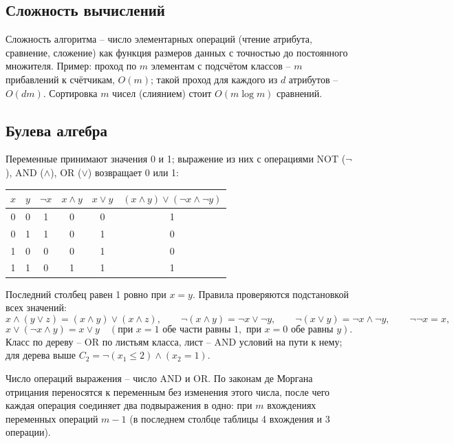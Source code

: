 \documentclass[12pt,a4paper]{article}
\begin{document}
\subsection{Сложность вычислений}

Сложность алгоритма -- число элементарных операций (чтение атрибута, сравнение,
сложение) как функция размеров данных с точностью до постоянного множителя. Пример:
проход по $m$ элементам с подсчётом классов -- $m$ прибавлений к счётчикам, $O(m)$;
такой проход для каждого из $d$ атрибутов -- $O(dm)$. Сортировка $m$ чисел
(слиянием) стоит $O(m\log m)$ сравнений.

\subsection{Булева алгебра}

\noindent\begin{minipage}{\textwidth}
Переменные принимают значения 0 и 1; выражение из них с операциями NOT ($\neg$),
AND ($\wedge$), OR ($\vee$) возвращает 0 или 1:
\begin{center}
\begin{tabular}{cccccc}
\toprule
$x$ & $y$ & $\neg x$ & $x \wedge y$ & $x \vee y$
  & $(x \wedge y) \vee (\neg x \wedge \neg y)$ \\
\midrule
0 & 0 & 1 & 0 & 0 & 1 \\
0 & 1 & 1 & 0 & 1 & 0 \\
1 & 0 & 0 & 0 & 1 & 0 \\
1 & 1 & 0 & 1 & 1 & 1 \\
\bottomrule
\end{tabular}
\end{center}
\end{minipage}\par\smallskip\noindent
Последний столбец равен 1 ровно при $x = y$. Правила проверяются подстановкой всех
значений:
\[
  x \wedge (y \vee z) = (x \wedge y) \vee (x \wedge z),
  \qquad
  \neg(x \wedge y) = \neg x \vee \neg y,
  \qquad
  \neg(x \vee y) = \neg x \wedge \neg y,
  \qquad
  \neg\neg x = x,
\]
\[
  x \vee (\neg x \wedge y) = x \vee y
  \quad (\text{при } x = 1 \text{ обе части равны } 1,
  \text{ при } x = 0 \text{ обе равны } y).
\]
Класс по дереву -- OR по листьям класса, лист -- AND условий на пути к нему; для
дерева выше $C_2 = \neg(x_1 \le 2) \wedge (x_2 = 1)$.

Число операций выражения -- число AND и OR. По законам де Моргана отрицания
переносятся к переменным без изменения этого числа, после чего каждая операция
соединяет два подвыражения в одно: при $m$ вхождениях переменных операций $m - 1$ (в
последнем столбце таблицы 4 вхождения и 3 операции).
\end{document}
